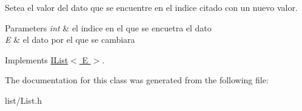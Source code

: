 Setea el valor del dato que se encuentre en el indice citado con un nuevo valor. 


\begin{DoxyParams}{Parameters}
{\em int} & el indice en el que se encuetra el dato \\
\hline
{\em E} & el dato por el que se cambiara \\
\hline
\end{DoxyParams}


Implements \hyperlink{class_i_list_a119ed658d2804aec0b9fef9325c03073}{I\-List$<$ E $>$}.



The documentation for this class was generated from the following file\-:\begin{DoxyCompactItemize}
\item 
list/List.\-h\end{DoxyCompactItemize}
